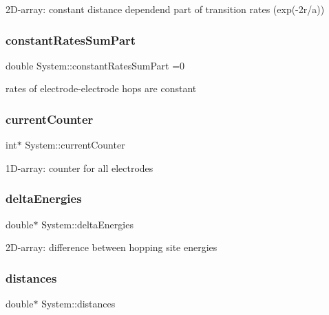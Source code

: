 2\+D-\/array\+: constant distance dependend part of transition rates (exp(-\/2r/a)) \mbox{\label{classSystem_a51bded18390c13a28f8737c3b7a911bb}} 
\subsubsection{\texorpdfstring{constant\+Rates\+Sum\+Part}{constantRatesSumPart}}
{\footnotesize\ttfamily double System\+::constant\+Rates\+Sum\+Part =0\hspace{0.3cm}{\ttfamily [private]}}

rates of electrode-\/electrode hops are constant \mbox{\label{classSystem_a8d4858c73f66a84785384ff1fb741e7e}} 
\subsubsection{\texorpdfstring{current\+Counter}{currentCounter}}
{\footnotesize\ttfamily int$\ast$ System\+::current\+Counter\hspace{0.3cm}{\ttfamily [private]}}

1\+D-\/array\+: counter for all electrodes \mbox{\label{classSystem_aef68ee60ffd49b2beafde87dcf4a4fe3}} 
\subsubsection{\texorpdfstring{delta\+Energies}{deltaEnergies}}
{\footnotesize\ttfamily double$\ast$ System\+::delta\+Energies\hspace{0.3cm}{\ttfamily [private]}}

2\+D-\/array\+: difference between hopping site energies \mbox{\label{classSystem_a682a961342b2200c748da544fb84488a}} 
\subsubsection{\texorpdfstring{distances}{distances}}
{\footnotesize\ttfamily double$\ast$ System\+::distances\hspace{0.3cm}{\ttfamily [private]}}

